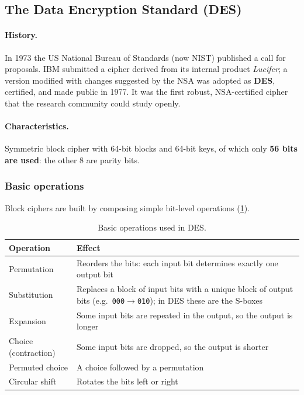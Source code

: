\subsection{The Data Encryption Standard (DES)}

\paragraph{History.} In 1973 the US National Bureau of Standards (now NIST) published a call for proposals. IBM submitted a cipher derived from its internal product \emph{Lucifer}; a version modified with changes suggested by the NSA was adopted as \textbf{DES}, certified, and made public in 1977. It was the first robust, NSA-certified cipher that the research community could study openly.

\paragraph{Characteristics.} Symmetric block cipher with 64-bit blocks and 64-bit keys, of which only \textbf{56 bits are used}: the other 8 are parity bits.

\subsubsection{Basic operations}
Block ciphers are built by composing simple bit-level operations (\cref{tab:des-ops}).

\begin{table}[H]
\centering
\caption{Basic operations used in DES.}
\label{tab:des-ops}
\begin{tabularx}{\textwidth}{@{}l X@{}}
\toprule
Operation & Effect \\
\midrule
Permutation & Reorders the bits: each input bit determines exactly one output bit \\
Substitution & Replaces a block of input bits with a unique block of output bits (e.g.\ \texttt{000}$\to$\texttt{010}); in DES these are the S-boxes \\
Expansion & Some input bits are repeated in the output, so the output is longer \\
Choice (contraction) & Some input bits are dropped, so the output is shorter \\
Permuted choice & A choice followed by a permutation \\
Circular shift & Rotates the bits left or right \\
\bottomrule
\end{tabularx}
\end{table}

